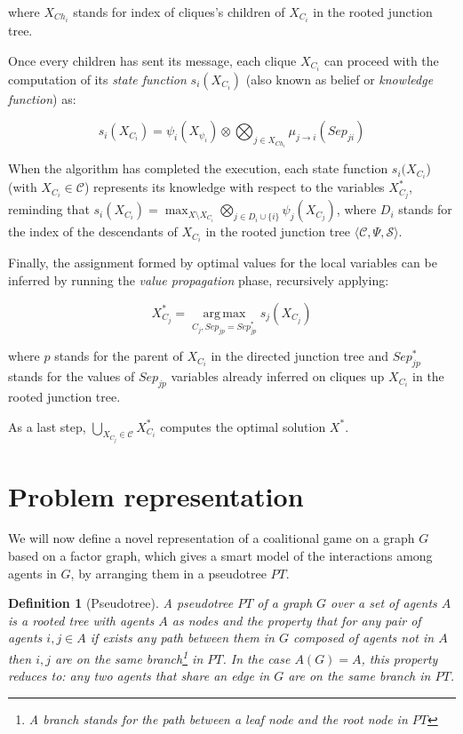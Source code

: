 \documentclass[11pt, twoside, titlepage, a4paper, openright]{report}
\newtheorem{Def}{Definition}
\begin{document}
\noindent where $X_{Ch_i}$ stands for index of cliques’s children of $X_{C_i}$ in the rooted junction tree.

\noindent Once every children has sent its message, each clique $X_{C_i}$ can proceed with the computation of its \textit{state function} $s_i(X_{C_i})$ (also known as belief or \textit{knowledge function}) as:

\begin{equation}\label{eq:state}s_i(X_{C_i})=\psi_i(X_{\psi_i})\otimes\bigotimes_{j \in X_{Ch_i}}\mu_{j \to i}(Sep_{ji})\end{equation}

\noindent When the algorithm has completed the execution, each state function $s_i(X_{C_i}$) (with $X_{C_i} \in \mathcal{C}$) represents its knowledge with respect to the variables $X^*_{C_j}$, reminding that $s_i(X_{C_i})=\operatorname*{max}_{X\setminus X_{C_i}}\bigotimes_{j \in D_i \cup \{i\}} \psi_j(X_{C_j})$, where $D_i$ stands for the index of the descendants of $X_{C_i}$ in the rooted junction tree $\langle\mathcal{C}, \Psi, \mathcal{S}\rangle$.

\noindent Finally, the assignment formed by optimal values for the local variables can be inferred by running the \textit{value propagation} phase, recursively applying:

\begin{equation}\label{eq:valprop}X^*_{C_j}=\operatorname*{arg\,max}_{C_j,Sep_{jp}=Sep^*_{jp}}s_j(X_{C_j})\end{equation}

\noindent where $p$ stands for the parent of $X_{C_i}$ in the directed junction tree and $Sep^*_{jp}$ stands for the values of $Sep_{jp}$ variables already inferred on cliques up $X_{C_i}$ in the rooted junction tree.

\noindent As a last step, $\bigcup_{X_{C_j} \in \mathcal{C}}X^*_{C_i}$ computes the optimal solution $X^*$.

\section{Problem representation}\label{sec:representation}

We will now define a novel representation of a coalitional game on a graph $G$ based on a factor graph, which gives a smart model of the interactions among agents in $G$, by arranging them in a pseudotree $PT$.

\begin{Def}[Pseudotree]
A pseudotree $PT$ of a graph $G$ over a set of agents $A$ is a rooted tree with agents $A$ as nodes and the property that for any pair of agents $i, j \in A$ if exists any path between them in $G$ composed of agents not in $A$ then $i, j$ are on the same branch\footnote{A branch stands for the path between a leaf node and the root node in $PT$} in $PT$. In the case $A(G)=A$, this property reduces
to: any two agents that share an edge in $G$ are on the same branch in $PT$.
\end{Def}
\end{document}
